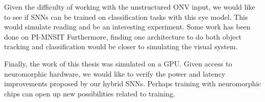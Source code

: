 \documentclass[../taasin.tex]{subfiles}
\begin{document}
Given the difficulty of working with the unstructured ONV input, we would like to see if SNNs can be trained on classification tasks with this eye model. This would simulate reading and be an interesting experiment. Some work has been done on PI-MNSIT \cite{} Furthermore, finding one architecture to do both object tracking and classification would be closer to simulating the visual system.

Finally, the work of this thesis was simulated on a GPU. Given access to neuromorphic hardware, we would like to verify the power and latency improvements proposed by our hybrid SNNs. Perhaps training with neuromorphic chips can open up new possibilities related to training.

\end{document}
